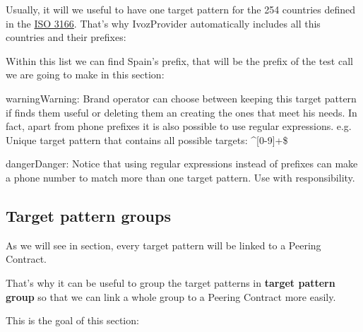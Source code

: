 \documentclass[letterpaper,10pt,english]{sphinxmanual}
\begin{document}
Usually, it will we useful to have one target pattern for the 254 countries
defined in the \href{https://es.wikipedia.org/wiki/ISO\_3166}{ISO 3166}. That's why IvozProvider automatically
includes all this countries and their prefixes:


Within this list we can find Spain's prefix, that will be the prefix of the test
call we are going to make in this section:


\begin{notice}{warning}{Warning:}
Brand operator can choose between keeping this target pattern if
finds them useful or deleting them an creating the ones that meet his needs. In
fact, apart from phone prefixes it is also possible to use regular expressions.
e.g. Unique target pattern that contains all possible targets: \textasciicircum{}{[}0-9{]}+\$
\end{notice}

\begin{notice}{danger}{Danger:}
Notice that using regular expressions instead of prefixes can make
a phone number to match more than one target pattern. Use with responsibility.
\end{notice}


\subsection{Target pattern groups}
\label{external_outgoing_calls/call_types:target-pattern-groups}
As we will see in {\hyperref[external_outgoing_calls/call_routing:outgoing\string-routes]{}} section, every target
pattern will be linked to a Peering Contract.

That's why it can be useful to group the target patterns in \textbf{target pattern group}
so that we can link a whole group to a Peering Contract more easily.

This is the goal of this section:

\end{document}
